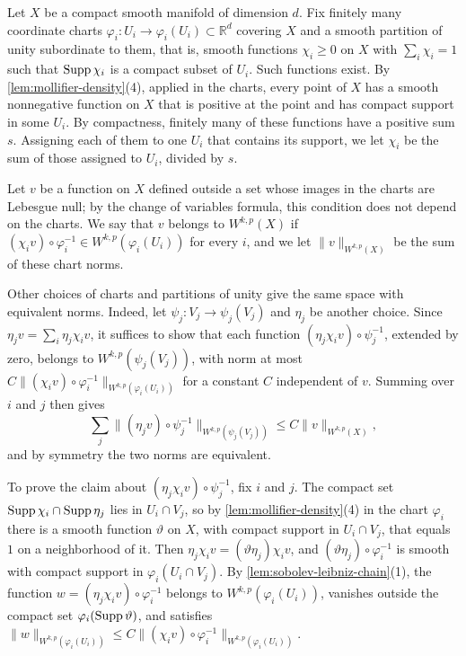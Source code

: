 Let $X$ be a compact smooth manifold of dimension $d$. Fix finitely many coordinate charts $\varphi_i\colon U_i\to\varphi_i(U_i)\subset\mathbb R^d$ covering $X$ and a smooth partition of unity subordinate to them, that is, smooth functions $\chi_i\geq0$ on $X$ with $\sum_i\chi_i=1$ such that $\operatorname{Supp}\chi_i$ is a compact subset of $U_i$. Such functions exist. By \cref{lem:mollifier-density}(4), applied in the charts, every point of $X$ has a smooth nonnegative function on $X$ that is positive at the point and has compact support in some $U_i$. By compactness, finitely many of these functions have a positive sum $s$. Assigning each of them to one $U_i$ that contains its support, we let $\chi_i$ be the sum of those assigned to $U_i$, divided by $s$.

Let $v$ be a function on $X$ defined outside a set whose images in the charts are Lebesgue null; by the change of variables formula, this condition does not depend on the charts. We say that $v$ belongs to $W^{k,p}(X)$ if $(\chi_iv)\circ\varphi_i^{-1}\in W^{k,p}(\varphi_i(U_i))$ for every $i$, and we let $\|v\|_{W^{k,p}(X)}$ be the sum of these chart norms.

Other choices of charts and partitions of unity give the same space with equivalent norms. Indeed, let $\psi_j\colon V_j\to\psi_j(V_j)$ and $\eta_j$ be another choice. Since $\eta_jv=\sum_i\eta_j\chi_iv$, it suffices to show that each function $(\eta_j\chi_iv)\circ\psi_j^{-1}$, extended by zero, belongs to $W^{k,p}(\psi_j(V_j))$, with norm at most $C\|(\chi_iv)\circ\varphi_i^{-1}\|_{W^{k,p}(\varphi_i(U_i))}$ for a constant $C$ independent of $v$. Summing over $i$ and $j$ then gives
\[
 \sum_j\|(\eta_jv)\circ\psi_j^{-1}\|_{W^{k,p}(\psi_j(V_j))}\leq C\|v\|_{W^{k,p}(X)},
\]
and by symmetry the two norms are equivalent.

To prove the claim about $(\eta_j\chi_iv)\circ\psi_j^{-1}$, fix $i$ and $j$. The compact set $\operatorname{Supp}\chi_i\cap\operatorname{Supp}\eta_j$ lies in $U_i\cap V_j$, so by \cref{lem:mollifier-density}(4) in the chart $\varphi_i$ there is a smooth function $\vartheta$ on $X$, with compact support in $U_i\cap V_j$, that equals $1$ on a neighborhood of it. Then $\eta_j\chi_iv=(\vartheta\eta_j)\chi_iv$, and $(\vartheta\eta_j)\circ\varphi_i^{-1}$ is smooth with compact support in $\varphi_i(U_i\cap V_j)$. By \cref{lem:sobolev-leibniz-chain}(1), the function $w=(\eta_j\chi_iv)\circ\varphi_i^{-1}$ belongs to $W^{k,p}(\varphi_i(U_i))$, vanishes outside the compact set $\varphi_i(\operatorname{Supp}\vartheta)$, and satisfies $\|w\|_{W^{k,p}(\varphi_i(U_i))}\leq C\|(\chi_iv)\circ\varphi_i^{-1}\|_{W^{k,p}(\varphi_i(U_i))}$.

